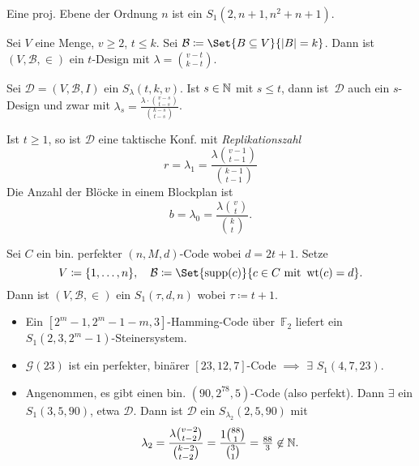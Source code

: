 \documentclass{cheat-sheet}
\newcommand{\F}{\mathbb{F}} %
\DeclareMathOperator{\wt}{wt} %
\newcommand{\Golay}{\mathcal{G}} %
\newcommand{\Design}{\mathcal{D}} %
\newcommand{\Blocks}{\mathcal{B}} %
\begin{document}
\begin{bsp}
  Eine proj. Ebene der Ordnung $n$ ist ein $S_1(2, n + 1, n^2 + n + 1)$.
\end{bsp}

\begin{bsp}
  Sei $V$ eine Menge, $v \geq 2$, $t \leq k$.
  Sei $\Blocks \coloneqq \Set{B \subseteq V}{\abs{B} = k}$.
  Dann ist $(V, \Blocks, {\in})$ ein $t$-Design mit $\lambda = \binom{v - t}{k - t}$.
\end{bsp}

\begin{prop}
  Sei $\Design = (V, \Blocks, I)$ ein $S_\lambda(t, k, v)$.
  Ist $s \in \mathbb{N}$ mit $s \leq t$, dann ist~$\Design$ auch ein $s$-Design und zwar mit $\lambda_s = \frac{\lambda \cdot \binom{v - s}{t-s}}{\binom{k-s}{t-s}}$.
\end{prop}

\begin{kor}
  Ist $t \geq 1$, so ist $\Design$ eine taktische Konf. mit \textit{Replikationszahl}
  \[ r = \lambda_1 = \frac{\lambda \binom{v-1}{t-1}}{\binom{k-1}{t-1}} \]
  Die Anzahl der Blöcke in einem Blockplan ist
  \[ b = \lambda_0 = \frac{\lambda \binom{v}{t}}{\binom{k}{t}}. \]
\end{kor}


\begin{satz}
  Sei $C$ ein bin. perfekter $(n, M, d)$-Code wobei $d = 2t+1$.
  Setze
  \[
    V \coloneqq \{ 1, \ldots, n \}, \quad
    \Blocks \coloneqq \Set{\supp(c)}{c \in C \text{ mit } \wt(c) = d}.
  \]
  Dann ist $(V, \Blocks, {\in})$ ein $S_1(\tau, d, n)$ wobei $\tau \coloneqq t+1$.
\end{satz}

\begin{bspe}
  \begin{itemize}
    \item Ein $[2^m-1, 2^m-1-m, 3]$-Hamming-Code über~$\F_2$ liefert ein $S_1(2, 3, 2^m-1)$-Steinersystem.
    \item $\Golay(23)$ ist ein perfekter, binärer $[23, 12, 7]$-Code $\implies$ $\exists$ $S_1(4, 7, 23)$.
    \item Angenommen, es gibt einen bin. $(90, 2^{78}, 5)$-Code (also perfekt).
    Dann $\exists$ ein $S_1(3, 5, 90)$, etwa $\Design$.
    Dann ist $\Design$ ein $S_{\lambda_2}(2, 5, 90)$ mit
    \[ \lambda_2 = \frac{\lambda \binom{v-2}{t-2}}{\binom{k-2}{t-2}} = \frac{1 \binom{88}{1}}{\binom{3}{1}} = \tfrac{88}{3} \not\in \mathbb{N}. \]
  \end{itemize}
\end{bspe}
\end{document}
